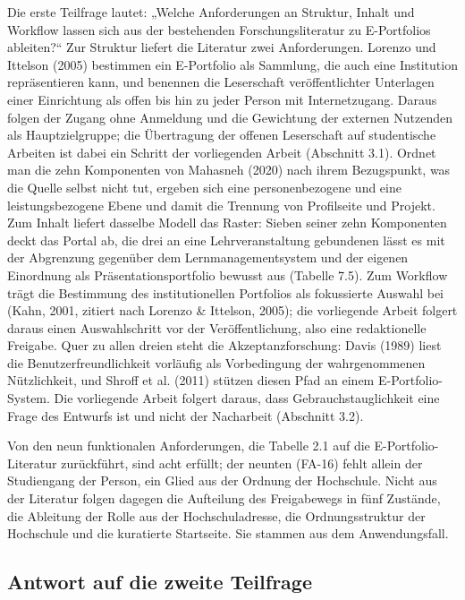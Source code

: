 Die erste Teilfrage lautet: „Welche Anforderungen an Struktur, Inhalt und Workflow lassen sich aus der bestehenden Forschungsliteratur zu E-Portfolios ableiten?“ Zur Struktur liefert die Literatur zwei Anforderungen. Lorenzo und Ittelson (2005) bestimmen ein E-Portfolio als Sammlung, die auch eine Institution repräsentieren kann, und benennen die Leserschaft veröffentlichter Unterlagen einer Einrichtung als offen bis hin zu jeder Person mit Internetzugang. Daraus folgen der Zugang ohne Anmeldung und die Gewichtung der externen Nutzenden als Hauptzielgruppe; die Übertragung der offenen Leserschaft auf studentische Arbeiten ist dabei ein Schritt der vorliegenden Arbeit (Abschnitt 3.1). Ordnet man die zehn Komponenten von Mahasneh (2020) nach ihrem Bezugspunkt, was die Quelle selbst nicht tut, ergeben sich eine personenbezogene und eine leistungsbezogene Ebene und damit die Trennung von Profilseite und Projekt. Zum Inhalt liefert dasselbe Modell das Raster: Sieben seiner zehn Komponenten deckt das Portal ab, die drei an eine Lehrveranstaltung gebundenen lässt es mit der Abgrenzung gegenüber dem Lernmanagementsystem und der eigenen Einordnung als Präsentationsportfolio bewusst aus (Tabelle 7.5). Zum Workflow trägt die Bestimmung des institutionellen Portfolios als fokussierte Auswahl bei (Kahn, 2001, zitiert nach Lorenzo \& Ittelson, 2005); die vorliegende Arbeit folgert daraus einen Auswahlschritt vor der Veröffentlichung, also eine redaktionelle Freigabe. Quer zu allen dreien steht die Akzeptanzforschung: Davis (1989) liest die Benutzerfreundlichkeit vorläufig als Vorbedingung der wahrgenommenen Nützlichkeit, und Shroff et al. (2011) stützen diesen Pfad an einem E-Portfolio-System. Die vorliegende Arbeit folgert daraus, dass Gebrauchstauglichkeit eine Frage des Entwurfs ist und nicht der Nacharbeit (Abschnitt 3.2).

Von den neun funktionalen Anforderungen, die Tabelle 2.1 auf die E-Portfolio-Literatur zurückführt, sind acht erfüllt; der neunten (FA-16) fehlt allein der Studiengang der Person, ein Glied aus der Ordnung der Hochschule. Nicht aus der Literatur folgen dagegen die Aufteilung des Freigabewegs in fünf Zustände, die Ableitung der Rolle aus der Hochschuladresse, die Ordnungsstruktur der Hochschule und die kuratierte Startseite. Sie stammen aus dem Anwendungsfall.

\subsection{Antwort auf die zweite Teilfrage}

